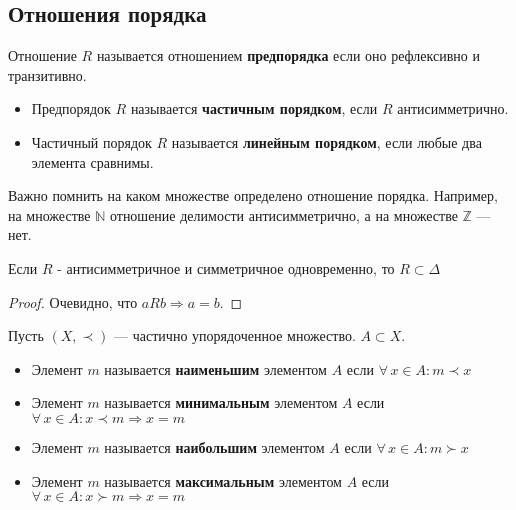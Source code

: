 \documentclass{article}
\begin{document}
\subsection{Отношения порядка}
    \begin{definition}
        \label{def:order-relations}
        Отношение \(R\) называется отношением \textbf{предпорядка} если оно рефлексивно и транзитивно.
        \begin{itemize}
            \item Предпорядок \(R\) называется \textbf{частичным порядком}, если \(R\) антисимметрично.
            \item Частичный порядок \(R\) называется \textbf{линейным порядком}, если любые два элемента сравнимы.
        \end{itemize}
    \end{definition}
    
    \begin{remark}
        \label{rem:parent-set-of-relation}
        Важно помнить на каком множестве определено отношение порядка. Например, на множестве \(\mathbb N\) отношение делимости антисимметрично, а на множестве \(\mathbb Z\) --- нет.
    \end{remark}
    
    \begin{proposition}
        \label{prop:antisym-sym-relation}
        Если \(R\) - антисимметричное и симметричное одновременно, то \(R \subset \Delta\)
    \end{proposition}
    \begin{proof}
        Очевидно, что \(aRb \Rightarrow a = b\). 
    \end{proof}
    
    \begin{definition}
        \label{def:maximal-minimal-elements}
        Пусть \((X, \prec)\) --- частично упорядоченное множество.  \(A \subset X\).
        \begin{itemize}
            \item Элемент \(m\) называется \textbf{наименьшим} элементом \(A\) если \(\forall\, x \in A: m \prec x\)
            \item Элемент \(m\) называется \textbf{минимальным} элементом \(A\) если \(\forall\, x \in A: x \prec m \Rightarrow x = m\)
            \item Элемент \(m\) называется \textbf{наибольшим} элементом \(A\) если \(\forall\, x \in A: m \succ x\)
            \item Элемент \(m\) называется \textbf{максимальным} элементом \(A\) если \(\forall\, x \in A: x \succ m \Rightarrow x = m\)
        \end{itemize}
    \end{definition}
    
\end{document}
